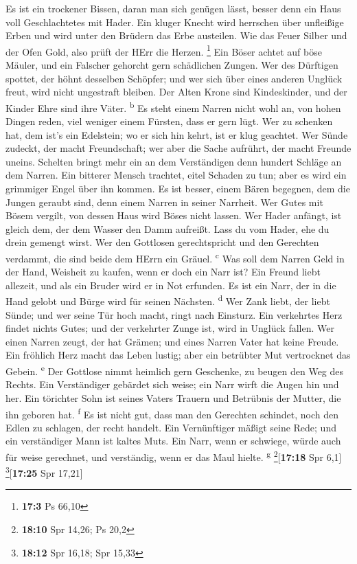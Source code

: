  Es ist ein trockener Bissen, daran man sich genügen
lässt, besser denn ein Haus voll Geschlachtetes mit Hader.
 Ein kluger Knecht wird herrschen über unfleißige Erben
und wird unter den Brüdern das Erbe austeilen.  Wie das
Feuer Silber und der Ofen Gold, also prüft der HErr die Herzen.
\footnote{\textbf{17:3} Ps 66,10}  Ein Böser achtet auf
böse Mäuler, und ein Falscher gehorcht gern schädlichen Zungen.
 Wer des Dürftigen spottet, der höhnt desselben Schöpfer;
und wer sich über eines anderen Unglück freut, wird nicht ungestraft
bleiben.  Der Alten Krone sind Kindeskinder, und der
Kinder Ehre sind ihre Väter. \textsuperscript{b}  Es steht
einem Narren nicht wohl an, von hohen Dingen reden, viel weniger einem
Fürsten, dass er gern lügt.  Wer zu schenken hat, dem
ist's ein Edelstein; wo er sich hin kehrt, ist er klug geachtet.
 Wer Sünde zudeckt, der macht Freundschaft; wer aber die
Sache aufrührt, der macht Freunde uneins.  Schelten
bringt mehr ein an dem Verständigen denn hundert Schläge an dem Narren.
 Ein bitterer Mensch trachtet, eitel Schaden zu tun; aber
es wird ein grimmiger Engel über ihn kommen.  Es ist
besser, einem Bären begegnen, dem die Jungen geraubt sind, denn einem
Narren in seiner Narrheit.  Wer Gutes mit Bösem vergilt,
von dessen Haus wird Böses nicht lassen.  Wer Hader
anfängt, ist gleich dem, der dem Wasser den Damm aufreißt. Lass du vom
Hader, ehe du drein gemengt wirst.  Wer den Gottlosen
gerechtspricht und den Gerechten verdammt, die sind beide dem HErrn ein
Gräuel. \textsuperscript{c}  Was soll dem Narren Geld in
der Hand, Weisheit zu kaufen, wenn er doch ein Narr ist? 
Ein Freund liebt allezeit, und als ein Bruder wird er in Not erfunden.
 Es ist ein Narr, der in die Hand gelobt und Bürge wird
für seinen Nächsten. \textsuperscript{d}  Wer Zank liebt,
der liebt Sünde; und wer seine Tür hoch macht, ringt nach Einsturz.
 Ein verkehrtes Herz findet nichts Gutes; und der
verkehrter Zunge ist, wird in Unglück fallen.  Wer einen
Narren zeugt, der hat Grämen; und eines Narren Vater hat keine Freude.
 Ein fröhlich Herz macht das Leben lustig; aber ein
betrübter Mut vertrocknet das Gebein. \textsuperscript{e}
 Der Gottlose nimmt heimlich gern Geschenke, zu beugen
den Weg des Rechts.  Ein Verständiger gebärdet sich
weise; ein Narr wirft die Augen hin und her.  Ein
törichter Sohn ist seines Vaters Trauern und Betrübnis der Mutter, die
ihn geboren hat. \textsuperscript{f}  Es ist nicht gut,
dass man den Gerechten schindet, noch den Edlen zu schlagen, der recht
handelt.  Ein Vernünftiger mäßigt seine Rede; und ein
verständiger Mann ist kaltes Muts.  Ein Narr, wenn er
schwiege, würde auch für weise gerechnet, und verständig, wenn er das
Maul hielte. \textsuperscript{g} \footnote{\textbf{18:10} Spr 14,26; Ps
  20,2}{[}\textbf{17:18} Spr 6,1{]} \footnote{\textbf{18:12} Spr 16,18;
  Spr 15,33}{[}\textbf{17:25} Spr 17,21{]}


